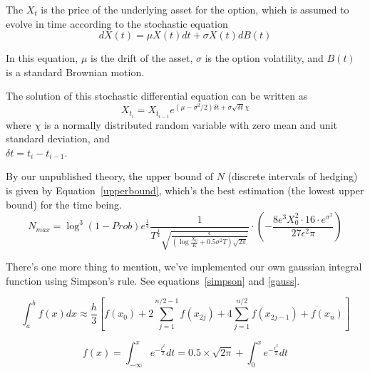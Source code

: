The $X_{t}$ is the price of the underlying asset for the option, which is assumed to evolve in time according to the stochastic equation
\begin{equation}
  dX(t) = \mu X(t)dt + \sigma X(t)dB(t)
\end{equation}

In this equation, $\mu$ is the drift of the asset, $\sigma$ is the option volatility, and $B(t)$ is a standard Brownian motion.

The solution of this stochastic differential equation can be written as 
\begin{equation}
  X_{t_i}=X_{t_{i-1}}e^{(\mu-\sigma^2/2)\delta t+\sigma\sqrt{\delta t}\chi}
\end{equation}
where $\chi$ is a normally distributed random variable with zero mean and unit standard deviation, and \\$\delta t = t_i - t_{i-1}$.


By our unpublished theory, the upper bound of $N$ (discrete intervals of hedging) is given by Equation~\ref{upperbound}, which's the best estimation (the lowest upper bound) for the time being. 
\begin{equation}
\label{upperbound}
  N_{max} = \log^3{(1-Prob)e^{\frac{1}{4}}\frac{1}{T^{\frac{1}{4}}\sqrt{\frac{\epsilon}{(\log{\frac{X_0}{K}}+0.5\sigma^2T)\sqrt{2\pi}}}}}\cdot(-\frac{8e^3X_0^2\cdot 16 \cdot e^{\sigma^2}}{27\epsilon^2\pi})
\end{equation}

There's one more thing to mention, we've implemented our own gaussian integral function using Simpson's rule. See equations~\ref{simpson} and \ref{gauss}.

\begin{equation}
\label{simpson}
\int_{a}^{b}f(x)dx\approx \frac{h}{3}\left[f(x_0)+2\sum\limits_{j=1}^{n/2-1}f(x_{2j})+4\sum\limits_{j=1}^{n/2}f(x_{2j-1})+f(x_n)\right]
\end{equation}

\begin{equation}
\label{gauss}
f(x)=\int_{-\infty}^{x}e^{-\frac{t^2}{2}}dt=0.5\times \sqrt{2\pi} + \int_{0}^{x}e^{-\frac{t^2}{2}}dt
\end{equation}





